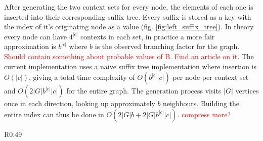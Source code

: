 \documentclass[thesis.tex]{subfiles}
\begin{document}
\par\noindent
After generating the two context sets for every node, the elements of each one is inserted into their corresponding suffix tree. Every suffix is stored as a key with the index of it's originating node as a value (fig. \ref{fig:left_suffix_tree}). In theory every node can have $4^{|c|}$ contexts in each set, in practice a more fair approximation is $b^{|c|}$ where $b$ is the observed branching factor for the graph. \textcolor{red}{Should contain something about probable values of B. Find an article on it}. 
The current implementation uses a naive suffix tree implementation where insertion is $O(|c|)$, giving a total time complexity of $O(b^{|c|}|c|)$ per node per context set and $O(2|G|b^{|c|}|c|)$ for the entire graph. The generation process visits $|G|$ vertices once in each direction, looking up approximately $b$ neighbours. Building the entire index can thus be done in $O(2|G|b + 2|G|b^{|c|}|c|)$. \textcolor{red}{compress more?}
\begin{wrapfigure}{R}{0.49\textwidth}
  \begin{mdframed}
  \end{mdframed}
  \caption{The left suffix tree corresponding to the graph in \ref{fig:explicit_contexts}}
  \label{fig:left_suffix_tree}
\end{wrapfigure}
\end{document}
